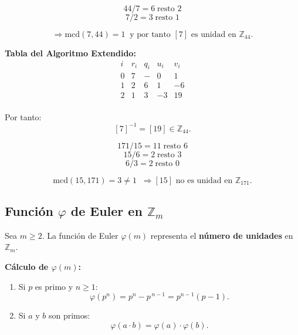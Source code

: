 \documentclass[a4paper,12pt]{article}
\begin{document}
\begin{ejemplo}[title={Inverso de \([7]\) en \(\mathbb{Z}_{44}\)}]
\[
44 / 7 = 6 \;\text{resto } 2
\]
\[
7 / 2 = 3 \;\text{resto } \boxed{1}
\]

\[
\Rightarrow \text{mcd}(7,44) = 1 \;\;\text{y por tanto } [7] \text{ es unidad en } \mathbb{Z}_{44}.
\]

\textbf{Tabla del Algoritmo Extendido:}
\[
\begin{array}{c|c|c|c|c}
i & r_i & q_i & u_i & v_i \\
\hline
0 & 7 & - & 0 & 1 \\
1 & 2 & 6 & 1 & -6 \\
2 & \boxed{1} & 3 & -3 & 19 \\
\end{array}
\]

Por tanto:
\[
[7]^{-1} = [19] \in \mathbb{Z}_{44}.
\]
\end{ejemplo}

\begin{ejemplo}[title={\([15]\) en \(\mathbb{Z}_{171}\) no tiene inverso}]
\[
171 / 15 = 11 \;\text{resto } 6
\]
\[
15 / 6 = 2 \;\text{resto } 3
\]
\[
6 / 3 = 2 \;\text{resto } \boxed{0}
\]

\[
\text{mcd}(15,171) = 3 \neq 1 \;\;\Rightarrow [15] \text{ no es unidad en } \mathbb{Z}_{171}.
\]
\end{ejemplo}

\subsection{Función \(\varphi\) de Euler en \(\mathbb{Z}_m\)}

\begin{procedimiento}[title={Número de unidades en \(\mathbb{Z}_m\) y función \(\varphi(m)\)}]
Sea \(m \ge 2\). La función de Euler \(\varphi(m)\) representa el \textbf{número de unidades} en \(\mathbb{Z}_m\).

\bigskip
\textbf{Cálculo de \(\varphi(m)\):}
\begin{enumerate}
    \item Si \(p\) es primo y \(n \ge 1\):
    \[
    \varphi(p^n) = p^n - p^{\,n-1} = p^{n-1}(p-1).
    \]
    \item Si $a$ y $b$ son primos:
    \[
    \varphi(a \cdot b) = \varphi(a) \cdot \varphi(b).
    \]
\end{enumerate}
\end{procedimiento}
\end{document}
